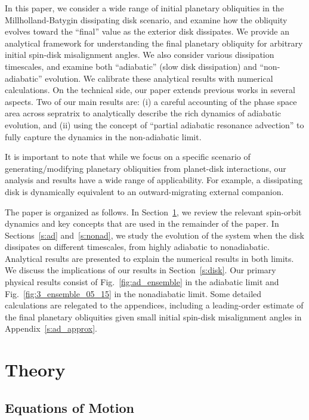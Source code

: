\documentclass[twocolumn,twocolappendix]{aastex63}
\begin{document}
In this paper, we consider a wide range of initial planetary obliquities in the
Millholland-Batygin dissipating disk scenario, and examine how the obliquity
evolves toward the ``final'' value as the exterior disk dissipates. We provide
an analytical framework for understanding the final planetary obliquity for
arbitrary initial spin-disk misalignment angles. We also consider various
dissipation timescales, and examine both ``adiabatic'' (slow disk dissipation)
and ``non-adiabatic'' evolution. We calibrate these analytical results with
numerical calculations. \textcolor{Corr}{ On the technical side, our paper
extends previous works \citep[such as][]{henrard1982, henrard1987,
millholland_disk} in several aspects. Two of our main results are: (i) a careful
accounting of the phase space area across sepratrix to analytically describe the
rich dynamics of adiabatic evolution, and (ii) using the concept of ``partial
adiabatic resonance advection'' to fully capture the dynamics in the
non-adiabatic limit.}

It is important to note that while we focus on a specific scenario of
generating/modifying planetary obliquities from planet-disk interactions, our
analysis and results have a wide range of applicability. For example, a
dissipating disk is dynamically equivalent to an outward-migrating external
companion.

The paper is organized as follows. In Section~\ref{s:eq}, we review the relevant
spin-orbit dynamics and key concepts that are used in the remainder of the
paper. In Sections~\ref{s:ad} and~\ref{s:nonad}, we study the evolution of the
system when the disk dissipates on different timescales, from highly adiabatic
to nonadiabatic. Analytical results are presented to explain the numerical
results in both limits. We discuss the implications of our results in
Section~\ref{s:disk}. Our primary physical results consist of
Fig.~\ref{fig:ad_ensemble} in the adiabatic limit and
Fig.~\ref{fig:3_ensemble_05_15} in the nonadiabatic limit. Some detailed
calculations are relegated to the appendices, including a leading-order
estimate of the final planetary obliquities given small initial spin-disk
misalignment angles in Appendix~\ref{s:ad_approx}.

\section{Theory}\label{s:eq}

\subsection{Equations of Motion}
\end{document}
